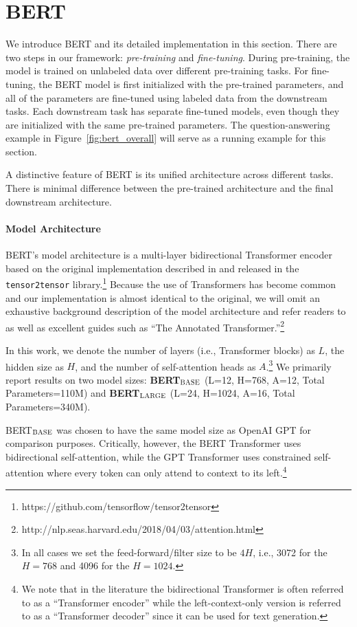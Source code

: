 \documentclass[11pt,a4paper]{article}
\newcommand\bertbase{BERT$_{\small \textsc{BASE}}$\xspace}
\newcommand\bertlarge{BERT$_{\small \textsc{LARGE}}$\xspace}
\begin{document}
\section{BERT}
\label{sec:bert}

We introduce BERT and its detailed implementation in this section. There are two steps in our framework: {\em pre-training} and {\em fine-tuning}. 
During pre-training, the model is trained on unlabeled data over different pre-training tasks.
For fine-tuning, the BERT model is first initialized with the pre-trained parameters, and all of the parameters are fine-tuned using labeled data from the downstream tasks. 
Each downstream task has separate fine-tuned models, even though they
are initialized with the same pre-trained parameters. The question-answering example in Figure~\ref{fig:bert_overall} will serve as a running example for this section.

A distinctive feature of BERT is its unified architecture across different tasks.
There is minimal difference between the pre-trained architecture and the final downstream architecture.

\paragraph{Model Architecture}
BERT's model architecture is a multi-layer bidirectional Transformer encoder based on the original implementation described in \citet{vaswani-etal:2017:_atten} and released in the {\tt tensor2tensor} library.\footnote{https://github.com/tensorflow/tensor2tensor} Because the use of Transformers has become common and our implementation is almost identical to the original, we will omit an exhaustive background description of the model architecture and refer readers to \citet{vaswani-etal:2017:_atten} as well as excellent guides such as ``The Annotated Transformer.''\footnote{http://nlp.seas.harvard.edu/2018/04/03/attention.html}

In this work, we denote the number of layers (i.e., Transformer blocks) as $L$, the hidden size as $H$, and the number of self-attention heads as $A$.\footnote{In all cases we set the feed-forward/filter size to be $4H$, i.e., 3072 for the $H=768$ and 4096 for the $H=1024$.} We primarily report results on two model sizes: {\bf \bertbase} (L=12, H=768, A=12, Total Parameters=110M) and {\bf \bertlarge} (L=24, H=1024, A=16, Total Parameters=340M).

\bertbase was chosen to have the same model size as OpenAI GPT for comparison purposes. Critically, however, the BERT Transformer uses bidirectional self-attention, while the GPT Transformer uses constrained self-attention where every token can only attend to context to its left.\footnote{We note that in the literature the bidirectional Transformer is often referred to as a ``Transformer encoder'' while the left-context-only version is referred to as a ``Transformer decoder'' since it can be used for text generation.} 
\end{document}
